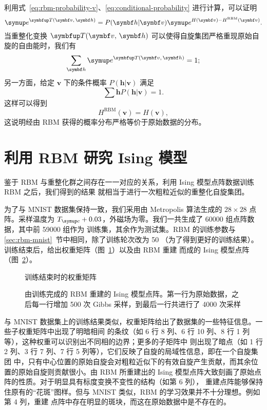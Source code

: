 利用式~\eqref{eq:rbm-probability-v}、\eqref{eq:conditional-probability} 进行计算，可以证明
\cite{exact}
\begin{equation}
  \ee^{\opT(\bm{v},\,\bm{h})} = P(\bm{h}|\bm{v}) \ee^{H(\bm{v})-H^{\text{RBM}}(\bm{v})}.
\end{equation}
当重整化变换 $\opT(\bm{v},\,\bm{h})$ 可以使得自旋集团严格重现原始自旋的自由能时，我们有
\begin{equation}
  \sum_{\bm{h}} \ee^{\opT(\bm{v},\,\bm{h})} = 1;
\end{equation}
另一方面，给定 $\bm{v}$ 下的条件概率 $P(\bm{h}|\bm{v})$ 满足
\begin{equation}
  \sum{\bm{h}} P(\bm{h}|\bm{v}) = 1.
\end{equation}
这样可以得到
\begin{equation}
  H^{\text{RBM}}(\bm{v}) = H(\bm{v}),
\end{equation}
这说明经由 RBM 获得的概率分布严格等价于原始数据的分布。

\section{利用 RBM 研究 Ising 模型}

鉴于 RBM 与重整化群之间存在一一对应的关系，利用 Ising 模型点阵数据训练 RBM 之后，我们得到的结果
就相当于进行一次粗粒近似的重整化自旋集团。

为了与 MNIST 数据集保持一致，我们采用由 Metropolis 算法生成的 $28 \times 28$ 点阵。采样温度为
$\Tc+\num{0.03}$，外磁场为零。我们一共生成了 \num{60000} 组点阵数据，其中前 \num{59000} 组作为
训练集，其余作为测试集。RBM 的训练参数与 \ref{sec:rbm-mnist}~节中相同，除了训练轮次改为 50
（为了得到更好的训练结果）。训练结束后，给出权重矩阵（图~\ref{fig:ising-weight}）以及由 RBM 重建
而成的 Ising 模型点阵（图~\ref{fig:ising-samples}）。

\begin{figure}[htb]
  \centering
  \caption{训练结束时的权重矩阵}
  \label{fig:ising-weight}
\end{figure}

\begin{figure}[htb]
  \centering
  \caption{由训练完成的 RBM 重建的 Ising 模型点阵。第一行为原始数据，之后每一行增加 \num{500}
    次 Gibbs 采样，到最后一行共进行了 \num{4000} 次采样}
  \label{fig:ising-samples}
\end{figure}

与 MNIST 数据集上的训练结果类似，权重矩阵给出了数据集的一些特征信息。一些子权重矩阵中出现了明暗相间
的条纹（如 6 行 8 列、6 行 10 列、8 行 1 列等），这种权重可以识别出不同相的边界；更多的子矩阵中
则出现了暗点（如 1 行 2 列、3 行 7 列、7 行 5 列等），它们反映了自旋的局域性信息，即在一个自旋集团
中，只有中心位置的原始自旋会对粗粒近似下的有效自旋产生贡献，而其余位置的原始自旋则贡献很小。由 RBM
所重建出的 Ising 模型点阵大致刻画了原始点阵的性质。对于明显具有标度变换不变性的结构（如第 6 列），
重建点阵能够保持住原有的“花斑”图样。但与 MNIST 类似，RBM 的学习效果并不十分理想。例如第 4 列，重建
点阵中存在明显的斑块，而这在原始数据中是不存在的。

